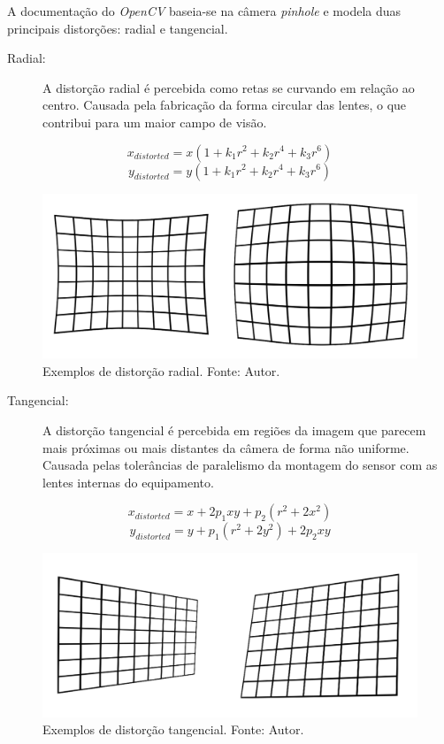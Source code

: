 A documentação do \textit{OpenCV} baseia-se na câmera \textit{pinhole} e modela duas principais distorções: radial e tangencial. 

\begin{description}
    \item[Radial:] A distorção radial é percebida como retas se curvando em relação ao centro. Causada pela fabricação da forma circular das lentes, o que contribui para um maior campo de visão.
\end{description}
\[ x_{distorted} = x(1+k_1 r^2 + k_2 r^4 + k_3 r^6) \]
\[ y_{distorted} = y(1+k_1 r^2 + k_2 r^4 + k_3 r^6) \]
\begin{figure}[H] %
    \centering
    \includegraphics[width=.65\linewidth]{figuras/radial-dist.png}
    \caption{Exemplos de distorção radial. Fonte: Autor.}
    \label{fig:radial_dist}
\end{figure}
\begin{description}
    \item[Tangencial:] A distorção tangencial é percebida em regiões da imagem que parecem mais próximas ou mais distantes da câmera de forma não uniforme. Causada pelas tolerâncias de paralelismo da montagem do sensor com as lentes internas do equipamento.
\end{description}
\[ x_{distorted} = x + 2 p_1 x y + p_2 (r^2 + 2x^2)\]
\[ y_{distorted} = y + p_1(r^2+2y^2)+2p_2xy\]
\begin{figure}[H] 
    \centering
    \includegraphics[width=.65\linewidth]{figuras/tan-dist.png}
    \caption{Exemplos de distorção tangencial. Fonte: Autor.}
    \label{fig:tan_dist}
\end{figure}

